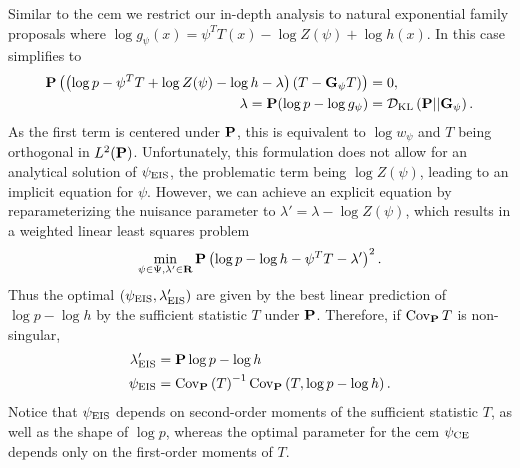 Similar to the \gls{cem} we restrict our in-depth analysis to natural exponential family proposals where $\log g_{\psi}(x) = \psi^{T}T(x) - \log Z(\psi) + \log h(x)$. In this case  simplifies to
\begin{align*}
    \P \left(\left( \log p - \psi^{T}T + \log Z(\psi) - \log h - \lambda \right)(T - \G_{\psi} T)\right) &= 0,\\
    \lambda = \P (\log p - \log g_{\psi}) &= \Dkl{\P}{\G_{\psi}}.
\end{align*}
As the first term is centered under $\P$, this is equivalent to $\log w_{\psi}$ and $T$ being orthogonal in $L^{2}(\P)$. 
Unfortunately, this formulation does not allow for an analytical solution of $\peis$, the problematic term being $\log Z(\psi)$, leading to an implicit equation for $\psi$. However, we can achieve an explicit equation by reparameterizing the nuisance parameter to $\lambda' = \lambda - \log Z(\psi)$, which results in a weighted linear least squares problem
\begin{align*}
    \min_{\psi \in \Psi, \lambda' \in \R} \P \left(\log p - \log h - \psi^{T}T - \lambda'\right)^{2}.
\end{align*}
Thus the optimal $ \left( \peis, \lambda'_{\text{EIS}} \right)$ are given by the best linear prediction of $\log p - \log h$ by the sufficient statistic $T$ under $\P$. Therefore, if $\cov_{\P} T$ is non-singular, 
\begin{align}
    \begin{split}
    \lambda'_{\text{EIS}} &= \P \log p - \log h \\
    \label{eq:peis-analytical}
    \peis &= \cov_{\P} \left( T \right)^{-1} \cov_{\P} \left(T, \log p - \log h \right).
    \end{split}
\end{align}
Notice that $\peis$ depends on second-order moments of the sufficient statistic $T$, as well as the shape of $\log p$, whereas the optimal parameter for the \gls{cem} $\pce$ depends only on the first-order moments of $T$. 

